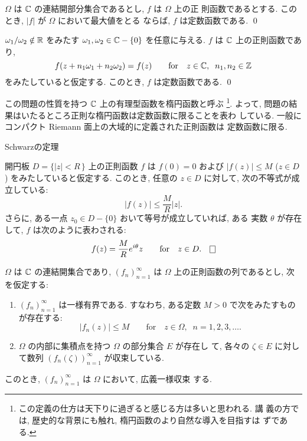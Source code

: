 \documentclass[12pt,twoside]{jarticle}
\begin{document}
\medskip

\begin{question}[最大絶対値の原理]
  $\Omega$ は ${\mathbb C}$ の連結開部分集合であるとし, $f$ は $\Omega$ 上の正
  則函数であるとする. このとき, $|f|$ が $\Omega$ において最大値をとる
  ならば, $f$ は定数函数である. \qed
\end{question}

\begin{question}\qstar{*}
  $\omega_1/\omega_2\notin{\mathbb R}$ をみたす $\omega_1,\omega_2\in{\mathbb C}-\{0\}$ 
  を任意に与える. $f$ は ${\mathbb C}$ 上の正則函数であり, 
  \[
    f(z + n_1\omega_1 + n_2\omega_2) = f(z)
    \qquad
    \text{for}
    \quad
    z\in{\mathbb C},\;\; n_1,n_2\in{\mathbb Z}
  \]%
  をみたしていると仮定する. このとき, $f$ は定数函数である. \qed
\end{question}

\noindent この問題の性質を持つ ${\mathbb C}$ 上の有理型函数を楕円函数と呼ぶ
\footnote{この定義の仕方は天下りに過ぎると感じる方は多いと思われる. 講
  義の方では, 歴史的な背景にも触れ, 楕円函数のより自然な導入を目指すは
  ずである.}. %
よって, 問題の結果はいたるところ正則な楕円函数は定数函数に限ることを表わ
している. 一般にコンパクト Riemann 面上の大域的に定義された正則函数は
定数函数に限る. 


 Schwarzの定理
\begin{question}
  開円板 $D=\{|z|<R\,\}$ 上の正則函数 $f$ は $f(0)=0$ および 
  $|f(z)|\le M$ ($z\in D$) をみたしていると仮定する. このとき, 任意の 
  $z\in D$ に対して, 次の不等式が成立している:
  \[
    |f(z)| \le \frac{M}{R} |z|.
  \]%
  さらに, ある一点 $z_0\in D - \{0\}$ おいて等号が成立していれば, ある
  実数 $\theta$ が存在して, $f$ は次のように表わされる:
  \[
    f(z) = \frac{M}{R} e^{i\theta} z
    \qquad
    \text{for}
    \quad
    z \in D.
  \qed
  \]%
\end{question}


\begin{question}
  $\Omega$ は ${\mathbb C}$ の連結開集合であり, $(f_n)_{n=1}^{\infty}$ は 
  $\Omega$ 上の正則函数の列であるとし, 次を仮定する:
  \begin{enumerate}
  \item $(f_n)_{n=1}^{\infty}$ は一様有界である. すなわち, ある定数 
    $M > 0$ で次をみたすものが存在する:
    \[
      |f_n(z)| \le M
      \qquad\text{for}\quad
      z\in\Omega,\;\; n=1,2,3,\dots.
    \]%
  \item $\Omega$ の内部に集積点を持つ $\Omega$ の部分集合 $E$ が存在し
    て, 各々の $\zeta\in E$ に対して数列 $(f_n(\zeta))_{n=1}^{\infty}$ 
    が収束している.
  \end{enumerate}
  このとき, $(f_n)_{n=1}^{\infty}$ は $\Omega$ において, 広義一様収束
  する. 
\end{question}
\end{document}
